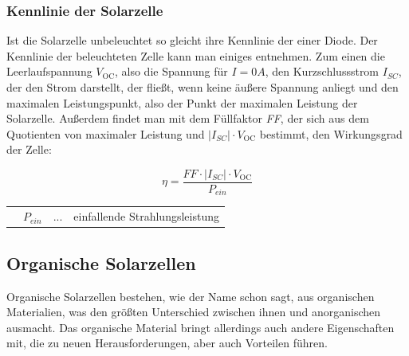 \documentclass[slug=SZ, room=Hermann-Krone-Bau\,\ Labor\ 1.25, supervisor=Martin\ Kroll]{../../Lab_Report_LaTeX/lab_report}
\newcommand{\voc}{V_{\text{OC}}}
\begin{document}
\subsubsection{Kennlinie der Solarzelle}

Ist die Solarzelle unbeleuchtet so gleicht ihre Kennlinie der einer Diode.
Der Kennlinie der beleuchteten Zelle kann man einiges entnehmen.
Zum einen die Leerlaufspannung \(\voc\), also die Spannung für \(I=0 A\), den Kurzschlussstrom \(I_{SC}\), der den
Strom darstellt, der fließt, wenn keine äußere Spannung anliegt und den maximalen Leistungspunkt, also der Punkt
der maximalen Leistung der Solarzelle. Außerdem findet man mit dem Füllfaktor \emph{FF}, der sich aus dem
Quotienten von maximaler Leistung und \(|I_{SC}| \cdot \voc\) bestimmt, den Wirkungsgrad der Zelle:

\begin{equation}\label{eq:wirkgrad}
        \eta = \frac{FF \cdot |I_{SC}| \cdot \voc}{P_{ein}}
\end{equation}

\begin{tabular}{llll}
         & \(P_{ein}\) & ... & einfallende Strahlungsleistung
\end{tabular}

\subsection{Organische Solarzellen}
\label{sec:orgsolar}

Organische Solarzellen bestehen, wie der Name schon sagt, aus organischen Materialien, was den größten
Unterschied zwischen ihnen und anorganischen ausmacht.
Das organische Material bringt allerdings auch andere Eigenschaften mit, die zu neuen Herausforderungen, aber
auch Vorteilen führen.\\
\end{document}
